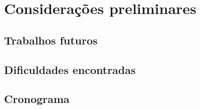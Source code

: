 \chapter{Considerações preliminares}
\label{cap-conclusoes}

\section{Trabalhos futuros}

\section{Dificuldades encontradas}

\section{Cronograma}
%
